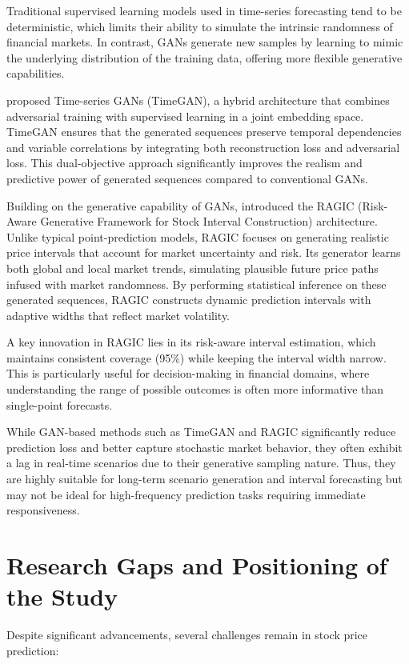 Traditional supervised learning models used in time-series forecasting tend to be deterministic, which limits their ability to simulate the intrinsic randomness of financial markets. In contrast, GANs generate new samples by learning to mimic the underlying distribution of the training data, offering more flexible generative capabilities.

\textcite{yoon_time-series_2019} proposed Time-series GANs (TimeGAN), a hybrid architecture that combines adversarial training with supervised learning in a joint embedding space. TimeGAN ensures that the generated sequences preserve temporal dependencies and variable correlations by integrating both reconstruction loss and adversarial loss. This dual-objective approach significantly improves the realism and predictive power of generated sequences compared to conventional GANs.

Building on the generative capability of GANs, \textcite{gu_ragic_2025} introduced the RAGIC (Risk-Aware Generative Framework for Stock Interval Construction) architecture. Unlike typical point-prediction models, RAGIC focuses on generating realistic price intervals that account for market uncertainty and risk. Its generator learns both global and local market trends, simulating plausible future price paths infused with market randomness. By performing statistical inference on these generated sequences, RAGIC constructs dynamic prediction intervals with adaptive widths that reflect market volatility.

A key innovation in RAGIC lies in its risk-aware interval estimation, which maintains consistent coverage (95\%) while keeping the interval width narrow. This is particularly useful for decision-making in financial domains, where understanding the range of possible outcomes is often more informative than single-point forecasts.

While GAN-based methods such as TimeGAN and RAGIC significantly reduce prediction loss and better capture stochastic market behavior, they often exhibit a lag in real-time scenarios due to their generative sampling nature. Thus, they are highly suitable for long-term scenario generation and interval forecasting but may not be ideal for high-frequency prediction tasks requiring immediate responsiveness.

\section{Research Gaps and Positioning of the Study}
Despite significant advancements, several challenges remain in stock price prediction:

